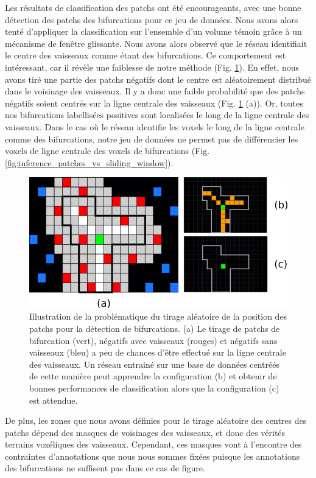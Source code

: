 Les résultats de classification des patchs ont été encourageants, avec une bonne détection des patchs des bifurcations pour ce jeu de données. Nous avons alors tenté d'appliquer la classification sur l'ensemble d'un volume témoin grâce à un mécanisme de fenêtre glissante. Nous avons alors observé que le réseau identifiait le centre des vaisseaux comme étant des bifurcations. Ce comportement est intéressant, car il révèle une faiblesse de notre méthode (Fig. \ref{fig:exp_patchs}). En effet, nous avons tiré une partie des patchs négatifs dont le centre est aléatoirement distribué dans le voisinage des vaisseaux. Il y a donc une faible probabilité que des patchs négatifs soient centrés sur la ligne centrale des vaisseaux (Fig. \ref{fig:exp_patchs} (a)). Or, toutes nos bifurcations labellisées positives sont localisées le long de la ligne centrale des vaisseaux. Dans le cas où le réseau identifie les voxels le long de la ligne centrale comme des bifurcations, notre jeu de données ne permet pas de différencier les voxels de ligne centrale des voxels de bifurcations (Fig. \ref{fig:inference_patches_vs_sliding_window}).
\begin{figure}[!ht]
    \centering
    \includegraphics[width=\textwidth]{Images/exp_biais.png}
    \caption{Illustration de la problématique du tirage aléatoire de la position des patchs pour la détection de bifurcations. (a) Le tirage de patchs de bifurcation (vert), négatifs avec vaisseaux (rouges) et négatifs sans vaisseaux (bleu) a peu de chances d'être effectué sur la ligne centrale des vaisseaux. Un réseau entrainé sur une base de données centréés de cette manière peut apprendre la configuration (b) et obtenir de bonnes performances de classification alors que la configuration (c) est attendue.}
    \label{fig:exp_patchs}
\end{figure}

De plus, les zones que nous avons définies pour le tirage aléatoire des centres des patchs dépend des masques de voisinages des vaisseaux, et donc des vérités terrains voxéliques des vaisseaux. Cependant, ces masques vont à l'encontre des contraintes d'annotations que nous nous sommes fixées puisque les annotations des bifurcations ne suffisent pas dans ce cas de figure.

